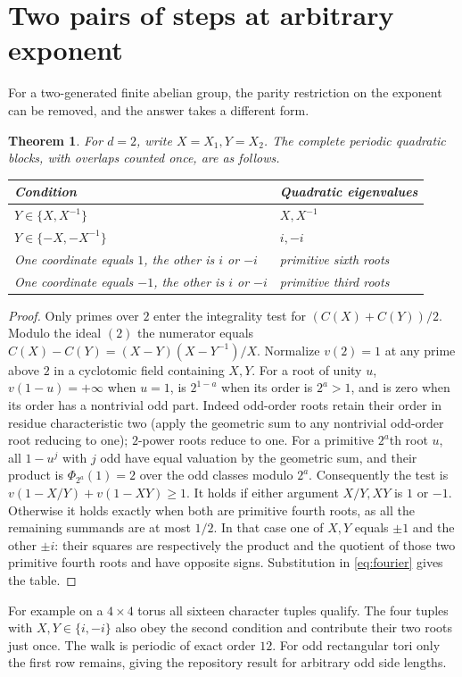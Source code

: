\documentclass[10pt]{article}
\newtheorem{theorem}{Theorem}
\begin{document}
\section{Two pairs of steps at arbitrary exponent}
For a two-generated finite abelian group, the parity restriction on the
exponent can be removed, and the answer takes a different form.
\begin{theorem}\label{t:two}
For $d=2$, write $X=X_1,Y=X_2$. The complete periodic quadratic blocks,
with overlaps counted once, are as follows.
\begin{center}\small
\begin{tabular}{ll}\toprule
Condition & Quadratic eigenvalues\\\midrule
$Y\in\{X,X^{-1}\}$ & $X,X^{-1}$\\
$Y\in\{-X,-X^{-1}\}$ & $i,-i$\\
One coordinate equals $1$, the other is $i$ or $-i$ & primitive sixth roots\\
One coordinate equals $-1$, the other is $i$ or $-i$ & primitive third roots\\
\bottomrule\end{tabular}
\end{center}
\end{theorem}
\begin{proof}
Only primes over $2$ enter the integrality test for $(C(X)+C(Y))/2$.
Modulo the ideal $(2)$ the numerator equals
$C(X)-C(Y)=(X-Y)(X-Y^{-1})/X$. Normalize $v(2)=1$ at any prime above
$2$ in a cyclotomic field containing $X,Y$. For a root of unity $u$,
$v(1-u)=+\infty$ when $u=1$, is $2^{1-a}$ when its order is
$2^a>1$, and is zero when its order has a nontrivial odd part. Indeed
odd-order roots retain their order in residue characteristic two (apply
the geometric sum to any nontrivial odd-order root reducing to one);
$2$-power roots reduce to one. For a primitive $2^a$th root $u$, all
$1-u^j$ with $j$ odd have equal valuation by the geometric sum, and
their product is $\Phi_{2^a}(1)=2$ over the odd classes modulo $2^a$.
Consequently the test is $v(1-X/Y)+v(1-XY)\ge1$. It holds if either
argument $X/Y,XY$ is $1$ or $-1$. Otherwise it holds exactly when both
are primitive fourth roots, as all the remaining summands are at most
$1/2$. In that case one of $X,Y$ equals $\pm1$ and the other $\pm i$:
their squares are respectively the product and the quotient of those two
primitive fourth roots and have opposite signs. Substitution in
\eqref{eq:fourier} gives the table.
\end{proof}
For example on a $4\times4$ torus all sixteen character tuples qualify.
The four tuples with $X,Y\in\{i,-i\}$ also obey the second
condition and contribute their two roots just once. The walk is periodic
of exact order $12$. For odd rectangular tori only the first row remains,
giving the repository result for arbitrary odd side lengths.
\end{document}
